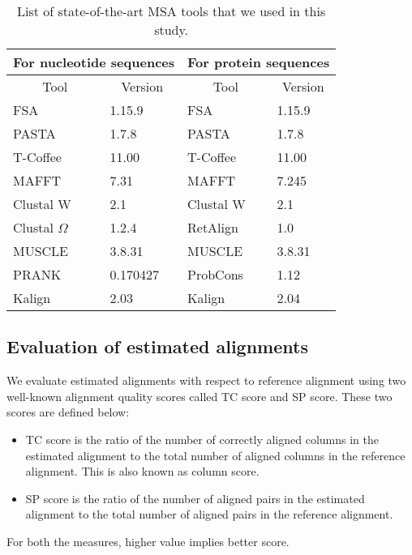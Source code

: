 \begin{table*}[htbp]
	\small
	\centering
	\caption{List of state-of-the-art MSA tools that we used in this study.}
	\begin{tabular}{|l|l||l|l|}
		\hline
		\multicolumn{2}{|c||}{For nucleotide sequences} & \multicolumn{2}{c|}{For protein sequences} \\
		\hline
		\multicolumn{1}{|c|}{Tool} & \multicolumn{1}{c||}{Version} & \multicolumn{1}{c|}{Tool} & \multicolumn{1}{c|}{Version} \\
		\hline
		FSA~\citep{bradley2009fast} & 1.15.9 & FSA   & 1.15.9 \\
		\hline
		PASTA~\citep{mirarab2015pasta} & 1.7.8 & PASTA & 1.7.8 \\
		\hline
		T-Coffee~\citep{notredame2000t} & 11.00 & T-Coffee & 11.00 \\
		\hline
		MAFFT~\citep{katoh2002mafft} & 7.31  & MAFFT & 7.245 \\
		\hline
		Clustal W~\citep{thompson1994clustal} & 2.1   & Clustal W & 2.1 \\
		\hline
		Clustal $ \Omega $~\citep{sievers2011fast} & 1.2.4 & RetAlign~\citep{szabo2010reticular} & 1.0 \\
		\hline
		MUSCLE~\citep{edgar2004muscle} & 3.8.31 & MUSCLE & 3.8.31 \\
		\hline
		PRANK~\citep{loytynoja2005algorithm} & 0.170427 & ProbCons~\citep{do2005probcons} & 1.12 \\
		\hline
		Kalign~\citep{lassmann2008kalign2} & 2.03  & Kalign & 2.04 \\
		\hline
	\end{tabular}%
	\label{tab:msa_tools}%
\end{table*}%



\subsection{Evaluation of estimated alignments}
We evaluate estimated alignments with respect to reference alignment using two well-known alignment quality scores called TC score and SP score. These two scores are defined below:
\begin{itemize}
	\item TC score is the ratio of the number of correctly aligned columns in the estimated alignment to the total number of aligned columns in the reference alignment. This is also known as column score.
	
	\item SP score is the ratio of the number of aligned pairs in the estimated alignment to the total number of aligned pairs in the reference alignment.
	
\end{itemize}
For both the measures, higher value implies better score.

